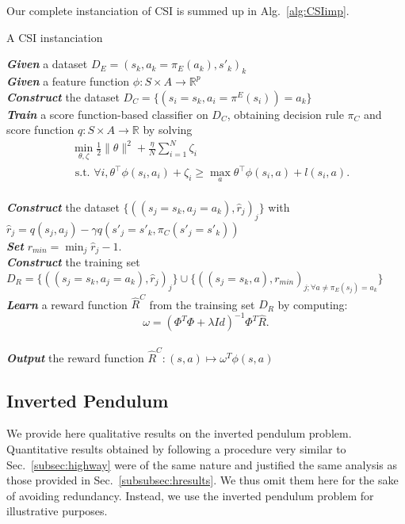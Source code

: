 \documentclass[smallextended]{svjour3}
\begin{document}
Our complete instanciation of CSI is summed up in Alg.~\ref{alg:CSIimp}.
\begin{algorithm}%
  \caption{A CSI instanciation}
  \label{alg:CSIimp}
  \emph{\textbf{Given}} a dataset  $D_E = (s_k,a_k=\pi_E(a_k),s'_k)_k$\;\\
  \emph{\textbf{Given}} a feature function $\phi: S\times A \rightarrow \mathbb{R}^p$\;\\
  \emph{\textbf{Construct}} the dataset $D_C=\{(s_i=s_k,a_i=\pi^E(s_i))=a_k\}$ \;\\
  \emph{\textbf{Train}} a score function-based classifier on $D_C$, obtaining decision rule $\pi_C$ and score function $q:S\times A \rightarrow \mathbb R$ by solving \begin{eqnarray*}
  &\min_{\theta,\zeta}\frac{1}{2}\|\theta\|^2 +
  \frac{\eta}{N}\sum_{i=1}^N \zeta_i \\
  &\text{~s.t.~} \forall i,
  \theta^\top{\phi}(s_i,a_i)+\zeta_i \geq \max_a \theta^\top
  {\phi}(s_i,a) + l(s_i,a). \label{eq:qp_taskar}
\end{eqnarray*}\;\\
\emph{\textbf{Construct}} the dataset $\{((s_{j}=s_k,a_{j}=a_k),\hat r_j)_j\}$ with $\hat r_j = q(s_j,a_j) - \gamma q(s'_j=s'_k,\pi_C(s'_j=s'_k))$\;\\
\emph{\textbf{Set}} $r_{min} = \min_j\hat r_j - 1.$\;\\
\emph{\textbf{Construct}} the training set  $D_R = \{((s_{j}=s_k,a_{j}=a_k),\hat r_j)_j\}\cup\{((s_j=s_k,a),r_{min})_{j;\forall a\neq \pi_E(s_j) = a_k}\}$ \;\\
\emph{\textbf{Learn}} a reward function $\hat R^C$ from the trainsing set $D_R$ by computing:
\begin{equation*}
  \omega = (\Phi^T\Phi + \lambda Id)^{-1}\Phi^T\hat R.
\end{equation*}\;\\
\emph{\textbf{Output}} the reward function $\hat R^{C}: (s,a) \mapsto \omega^T \phi(s,a)$ \;
\end{algorithm}

\subsection{Inverted Pendulum}
\label{subsec:IP}
We provide here qualitative results on the inverted pendulum problem. Quantitative results obtained by following a procedure very similar to Sec.~\ref{subsec:highway} were of the same nature and justified the same analysis as those provided in Sec.~\ref{subsubsec:hresults}. We thus omit them here for the sake of avoiding redundancy. Instead, we use the inverted pendulum problem for illustrative purposes.
\end{document}
